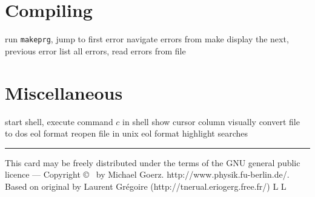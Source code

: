 \section{Compiling}
 {run {\tt makeprg}, jump to first error}
 {navigate errors from make}
 {display the next, previous error}
 {list all errors, read errors from file}



\section{Miscellaneous}
 {start shell, execute command $c$ in shell}
 {show cursor column visually}
 {convert file to dos eol format} 
 {reopen file in unix eol format}
 {highlight searches}

\vfill \hrule\smallskip
{\smallrm This card may be freely distributed under
the terms of the GNU general public licence ---
Copyright \copyright\ {} by Michael Goerz.
{\smalltt http://www.physik.fu-berlin.de/}. Based on original by
Laurent Gr\'egoire  ({\smalltt http://tnerual.eriogerg.free.fr/})}
\supereject
\if L\lr \else\null\vfill\eject\fi
\if L\lr \else\null\vfill\eject\fi
\bye

